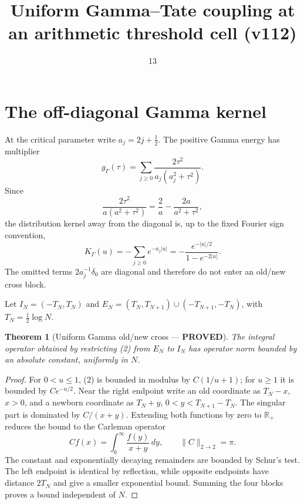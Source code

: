 \documentclass[11pt]{article}
\title{Uniform Gamma--Tate coupling at an arithmetic threshold cell (v112)}
\date{13}
\newcommand{\PROVED}{\textcolor{green!40!black}{\textbf{PROVED}}}
\newtheorem{theorem}{Theorem}
\begin{document}
\maketitle

\section{The off-diagonal Gamma kernel}

At the critical parameter write $a_j=2j+\tfrac12$.  The positive Gamma
energy has multiplier
\begin{equation}
 g_\Gamma(\tau)=\sum_{j\ge0}
 \frac{2\tau^2}{a_j(a_j^2+\tau^2)}.                            \tag{1}
\end{equation}
Since
\[
 \frac{2\tau^2}{a(a^2+\tau^2)}=\frac2a-\frac{2a}{a^2+\tau^2},
\]
the distribution kernel away from the diagonal is, up to the fixed Fourier
sign convention,
\begin{equation}
 K_\Gamma(u)=-\sum_{j\ge0}e^{-a_j|u|}
 =-\frac{e^{-|u|/2}}{1-e^{-2|u|}}.                            \tag{2}
\end{equation}
The omitted terms $2a_j^{-1}\delta_0$ are diagonal and therefore do not
enter an old/new cross block.

Let $I_N=(-T_N,T_N)$ and
$E_N=(T_N,T_{N+1})\cup(-T_{N+1},-T_N)$, with
$T_N=\tfrac12\log N$.

\begin{theorem}[Uniform Gamma old/new cross --- \PROVED]
The integral operator obtained by restricting (2) from $E_N$ to $I_N$ has
operator norm bounded by an absolute constant, uniformly in $N$.
\end{theorem}

\begin{proof}
For $0<u\le1$, (2) is bounded in modulus by
$C(1/u+1)$; for $u\ge1$ it is bounded by $Ce^{-u/2}$.  Near the right
endpoint write an old coordinate as $T_N-x$, $x>0$, and a newborn
coordinate as $T_N+y$, $0<y<T_{N+1}-T_N$.  The singular part is dominated
by $C/(x+y)$.  Extending both functions by zero to $\mathbb R_+$ reduces
the bound to the Carleman operator
\[
 Cf(x)=\int_0^\infty\frac{f(y)}{x+y}\,dy,
 \qquad \|C\|_{2\to2}=\pi.
\]
The constant and exponentially decaying remainders are bounded by Schur's
test.  The left endpoint is identical by reflection, while opposite
endpoints have distance $2T_N$ and give a smaller exponential bound.
Summing the four blocks proves a bound independent of $N$.
\end{proof}
\end{document}
